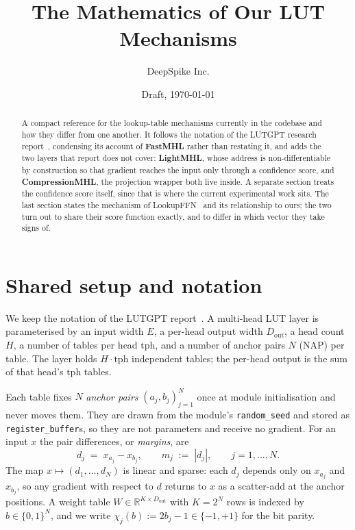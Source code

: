 \documentclass[11pt]{article}
\title{\vspace{-1.2cm}\textbf{The Mathematics of Our LUT Mechanisms}}
\author{DeepSpike Inc.}
\date{Draft, \today}
\newcommand{\NAP}{N}
\newcommand{\Rows}{K}
\begin{document}
\maketitle
\vspace{-0.8cm}

\begin{abstract}
\noindent A compact reference for the lookup-table mechanisms currently in the codebase and
how they differ from one another. It follows the notation of the LUTGPT research
report~\cite{lutgpt}, condensing its account of \textbf{FastMHL} rather than restating it,
and adds the two layers that report does not cover: \textbf{LightMHL}, whose address is
non-differentiable by construction so that gradient reaches the input only through a
confidence score, and \textbf{CompressionMHL}, the projection wrapper both live inside. A
separate section treats the confidence score itself, since that is where the current
experimental work sits. The last section states the mechanism of
LookupFFN~\cite{lookupffn} and its relationship to ours; the two turn out to share their
score function exactly, and to differ in which vector they take signs of.
\end{abstract}

\section{Shared setup and notation}

We keep the notation of the LUTGPT report~\cite{lutgpt}. A multi-head LUT layer is
parameterised by an input width $E$, a per-head output width $D_{\text{out}}$, a head
count $H$, a number of tables per head $\mathrm{tph}$, and a number of anchor pairs
$\NAP$ (NAP) per table. The layer holds $H\cdot\mathrm{tph}$ independent tables; the
per-head output is the sum of that head's $\mathrm{tph}$ tables.

Each table fixes $\NAP$ \emph{anchor pairs} $(a_j,b_j)_{j=1}^{\NAP}$ once at module
initialisation and never moves them. They are drawn from the module's
\texttt{random\_seed} and stored as \texttt{register\_buffer}s, so they are not
parameters and receive no gradient. For an input $x$ the pair differences, or
\emph{margins}, are
\begin{equation}
  d_j \;=\; x_{a_j} - x_{b_j}, \qquad m_j \;:=\; |d_j|, \qquad j=1,\dots,\NAP .
  \label{eq:margins}
\end{equation}
The map $x\mapsto(d_1,\dots,d_\NAP)$ is linear and sparse: each $d_j$ depends only on
$x_{a_j}$ and $x_{b_j}$, so any gradient with respect to $d$ returns to $x$ as a
scatter-add at the anchor positions. A weight table $W\in\mathbb{R}^{\Rows\times
D_{\text{out}}}$ with $\Rows=2^{\NAP}$ rows is indexed by $b\in\{0,1\}^{\NAP}$, and we
write $\chi_j(b):=2b_j-1\in\{-1,+1\}$ for the bit parity.
\end{document}
